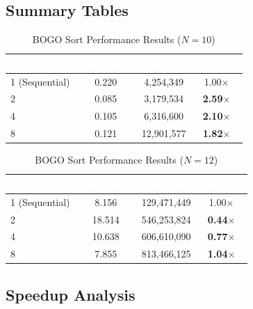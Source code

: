 \documentclass[11pt]{article}
\begin{document}
\subsection{Summary Tables}

\begin{table}[htbp]
\centering
\sffamily\small
\caption{BOGO Sort Performance Results ($N = 10$)}
\vspace{6pt}
\begin{tabular}{@{}lccc@{}}
\toprule
\rowcolor{tableheader}
\textcolor{white}{\textbf{Threads}} & \textcolor{white}{\textbf{Time (sec)}} & \textcolor{white}{\textbf{Shuffles}} & \textcolor{white}{\textbf{Speedup}} \\
\midrule
\rowcolor{rowalt}
1 (Sequential) & 0.220 & 4,254,349 & 1.00$\times$ \\
2 & 0.085 & 3,179,534 & {\color{accentgreen}\textbf{2.59$\times$}} \\
\rowcolor{rowalt}
4 & 0.105 & 6,316,600 & {\color{accentgreen}\textbf{2.10$\times$}} \\
8 & 0.121 & 12,901,577 & {\color{accentgreen}\textbf{1.82$\times$}} \\
\bottomrule
\end{tabular}
\end{table}

\begin{table}[htbp]
\centering
\sffamily\small
\caption{BOGO Sort Performance Results ($N = 12$)}
\vspace{6pt}
\begin{tabular}{@{}lccc@{}}
\toprule
\rowcolor{tableheader}
\textcolor{white}{\textbf{Threads}} & \textcolor{white}{\textbf{Time (sec)}} & \textcolor{white}{\textbf{Shuffles}} & \textcolor{white}{\textbf{Speedup}} \\
\midrule
\rowcolor{rowalt}
1 (Sequential) & 8.156 & 129,471,449 & 1.00$\times$ \\
2 & 18.514 & 546,253,824 & {\color{accentred}\textbf{0.44$\times$}} \\
\rowcolor{rowalt}
4 & 10.638 & 606,610,090 & {\color{accentred}\textbf{0.77$\times$}} \\
8 & 7.855 & 813,466,125 & {\color{accentgreen}\textbf{1.04$\times$}} \\
\bottomrule
\end{tabular}
\end{table}

\subsection{Speedup Analysis}
\end{document}
